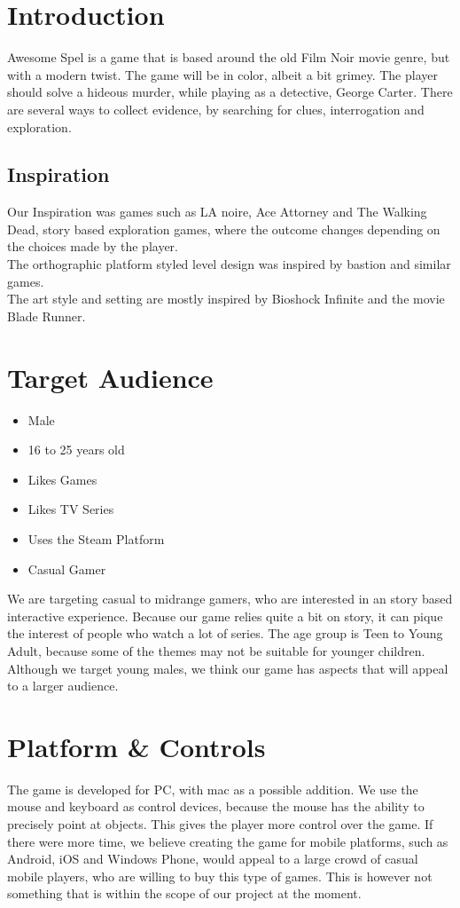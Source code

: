 \documentclass{article}
\begin{document}
	\newpage

\section{Introduction}
	Awesome Spel is a game that is based around the old Film Noir movie genre, but with a modern twist. The game will be in color, albeit a bit grimey. The player should solve a hideous murder, while playing as a detective, George Carter. There are several ways to collect evidence, by searching for clues, interrogation and exploration.

	\subsection{Inspiration}
		Our Inspiration was games such as LA noire, Ace Attorney and The Walking Dead, story based exploration games, where the outcome changes depending on the choices made by the player.\\
		The orthographic platform styled level design was inspired by bastion and similar games.\\
		The art style and setting are mostly inspired by Bioshock Infinite and the movie Blade Runner.
\section{Target Audience}
	\begin{itemize}
		\item Male
		\item 16 to 25 years old
		\item Likes Games
		\item Likes TV Series
		\item Uses the Steam Platform
		\item Casual Gamer
	\end{itemize}
	We are targeting casual to midrange gamers, who are interested in an story based interactive experience. Because our game relies quite a bit on story, it can pique the interest of people who watch a lot of series. The age group is Teen to Young Adult, because some of the themes may not be suitable for younger children. Although we target young males, we think our game has aspects that will appeal to a larger audience.


\section{Platform \& Controls}
	The game is developed for PC, with mac as a possible addition. We use the mouse and keyboard as control devices, because the mouse has the ability to precisely point at objects. This gives the player more control over the game. If there were more time, we believe creating the game for mobile platforms, such as Android, iOS and Windows Phone, would appeal to a large crowd of casual mobile players, who are willing to buy this type of games. This is however not something that is within the scope of our project at the moment.
\end{document}
